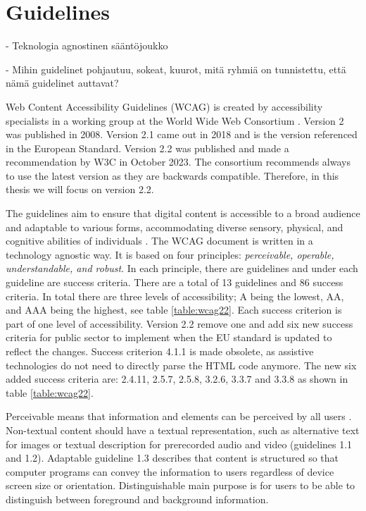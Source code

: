 \section{Guidelines}

- Teknologia agnostinen sääntöjoukko

- Mihin guidelinet pohjautuu, sokeat, kuurot, mitä ryhmiä on tunnistettu, että nämä guidelinet auttavat?

Web Content Accessibility Guidelines (WCAG) is created by accessibility specialists in a working group at the World Wide Web Consortium \citep{wcagoverview}. Version 2 was published in 2008. Version 2.1 came out in 2018 and is the version referenced in the European Standard. Version 2.2 was published and made a recommendation by W3C in October 2023. The consortium recommends always to use the latest version as they are backwards compatible. Therefore, in this thesis we will focus on version 2.2.

The guidelines aim to ensure that digital content is accessible to a broad audience and adaptable to various forms, accommodating diverse sensory, physical, and cognitive abilities of individuals \citep{wcag22}. The WCAG document is written in a technology agnostic way. It is based on four principles: \textit{perceivable, operable, understandable, and robust}. In each principle, there are guidelines and under each guideline are success criteria. There are a total of 13 guidelines and 86 success criteria. In total there are three levels of accessibility; A being the lowest, AA, and AAA being the highest, see table \ref{table:wcag22}. Each success criterion is part of one level of accessibility. Version 2.2 remove one and add six new success criteria for public sector to implement when the EU standard is updated to reflect the changes. Success criterion 4.1.1 is made obsolete, as assistive technologies do not need to directly parse the HTML code anymore. The new six added success criteria are: 2.4.11, 2.5.7, 2.5.8, 3.2.6, 3.3.7 and 3.3.8 as shown in table \ref{table:wcag22}. 



Perceivable means that information and elements can be perceived by all users \citep{wcag22}. Non-textual content should have a textual representation, such as alternative text for images or textual description for prerecorded audio and video (guidelines 1.1 and 1.2). Adaptable guideline 1.3 describes that content is structured so that computer programs can convey the information to users regardless of device screen size or orientation. Distinguishable main purpose is for users to be able to distinguish between foreground and background information.

